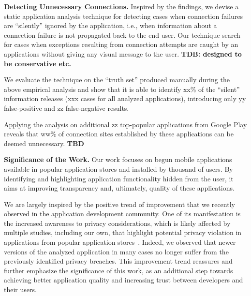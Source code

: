 

\vspace{0.1in}
\noindent 
{\bf Detecting Unnecessary Connections.}
Inspired by the findings, we devise a static application analysis technique for detecting cases when connection failures are
``silently''  ignored by the application, i.e., when information about a connection failure is not propagated back to the end user.
Our technique search for cases when exceptions resulting from connection attempts are caught by an applications without giving any visual message to the user. 
{\bf TDB: designed to be conservative etc.}

We evaluate the technique on the ``truth set'' produced manually during the above empirical analysis and show that it is able to identify xx\% of the ``silent'' information releases (xxx cases for all analyzed applications), introducing only yy false-positive and zz false-negative results. 

Applying the analysis on additional zz top-popular applications from Google Play reveals that ww\% of connection sites established by these applications can be deemed unnecessary.
{\bf TBD}


\vspace{0.1in}
\noindent 
{\bf Significance of the Work.}
Our work focuses on begun mobile applications available in popular application stores and installed by thousand of users.
By identifying and highlighting application functionality hidden from the user, it aims at improving transparency and, ultimately, quality of these applications. 
 
We are largely inspired by the positive trend of improvement that we recently observed in the application development community.
One of its manifestation is the increased awareness to privacy considerations, which is likely affected by multiple studies, including our own, that highlight
potential privacy violation in applications from popular application stores~\cite{Enck:Gilbert:Chun:Cox:Jung:McDaniel:Sheth:OSDI10, Egele:Kruegel:Kirda:Vign:NDSS11,Tripp:Rubin:SEC14}.
Indeed, we observed that newer versions of the analyzed application in many cases no longer suffer from the previously identified privacy breaches.  
This improvement trend reassures and further emphasize the significance of this work, as an additional step towards achieving better application quality and increasing trust between developers and their users. 



